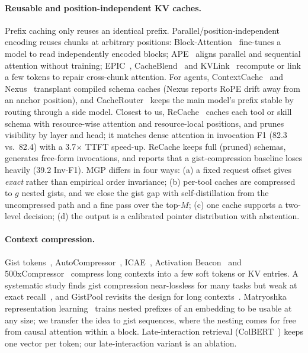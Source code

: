 \documentclass[sigconf,review,anonymous]{acmart}
\newcommand{\method}{MGP}
\begin{document}
\paragraph{Reusable and position-independent KV caches.}
Prefix caching only reuses an identical prefix.
Parallel/position-independent encoding reuses chunks at arbitrary positions: Block-Attention~\cite{sun2025blockattention} fine-tunes a model to read independently encoded blocks; APE~\cite{yang2025ape} aligns parallel and sequential attention without training; EPIC~\cite{hu2025epic}, CacheBlend~\cite{yao2025cacheblend} and KVLink~\cite{yang2025kvlink} recompute or link a few tokens to repair cross-chunk attention.
For agents, ContextCache~\cite{sarkar2026contextcache} and Nexus~\cite{arslan2026nexus} transplant compiled schema caches (Nexus reports RoPE drift away from an anchor position), and CacheRouter~\cite{zha2026cacherouter} keeps the main model's prefix stable by routing through a side model.
Closest to us, ReCache~\cite{fang2026recache} caches each tool or skill schema with resource-wise attention and resource-local positions, and prunes visibility by layer and head; it matches dense attention in invocation F1 (82.3 vs.\ 82.4) with a 3.7$\times$ TTFT speed-up.
ReCache keeps full (pruned) schemas, generates free-form invocations, and reports that a gist-compression baseline loses heavily (39.2 Inv-F1).
\method{} differs in four ways: (a) a fixed request offset gives \emph{exact} rather than empirical order invariance; (b) per-tool caches are compressed to $g$ nested gists, and we close the gist gap with self-distillation from the uncompressed path and a fine pass over the top-$M$; (c) one cache supports a two-level decision; (d) the output is a calibrated pointer distribution with abstention.

\paragraph{Context compression.}
Gist tokens~\cite{mu2023gist}, AutoCompressor~\cite{chevalier2023autocompressor}, ICAE~\cite{ge2024icae}, Activation Beacon~\cite{zhang2024beacon} and 500xCompressor~\cite{li2024500x} compress long contexts into a few soft tokens or KV entries.
A systematic study finds gist compression near-lossless for many tasks but weak at exact recall~\cite{deng2025giststudy}, and GistPool revisits the design for long contexts~\cite{petrov2025gistpool}.
Matryoshka representation learning~\cite{kusupati2022matryoshka} trains nested prefixes of an embedding to be usable at any size; we transfer the idea to gist sequences, where the nesting comes for free from causal attention within a block.
Late-interaction retrieval (ColBERT~\cite{khattab2020colbert}) keeps one vector per token; our late-interaction variant is an ablation.
\end{document}
